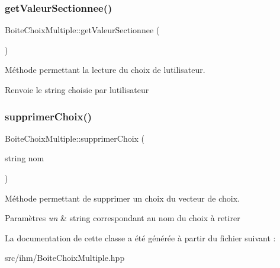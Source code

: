 \subsubsection{\texorpdfstring{get\+Valeur\+Sectionnee()}{getValeurSectionnee()}}
{\footnotesize\ttfamily Boite\+Choix\+Multiple\+::get\+Valeur\+Sectionnee (\begin{DoxyParamCaption}{ }\end{DoxyParamCaption})}



Méthode permettant la lecture du choix de l\textquotesingle{}utilisateur. 

\begin{DoxyReturn}{Renvoie}
le string choisie par l\textquotesingle{}utilisateur 
\end{DoxyReturn}
\mbox{\label{class_boite_choix_multiple_ab37e456d084fb9e70d7e24df0839916f}} 
\subsubsection{\texorpdfstring{supprimer\+Choix()}{supprimerChoix()}}
{\footnotesize\ttfamily Boite\+Choix\+Multiple\+::supprimer\+Choix (\begin{DoxyParamCaption}\item[{string}]{nom }\end{DoxyParamCaption})}



Méthode permettant de supprimer un choix du vecteur de choix. 


\begin{DoxyParams}{Paramètres}
{\em un} & string correspondant au nom du choix à retirer \\
\hline
\end{DoxyParams}


La documentation de cette classe a été générée à partir du fichier suivant \+:\begin{DoxyCompactItemize}
\item 
src/ihm/Boite\+Choix\+Multiple.\+hpp\end{DoxyCompactItemize}
